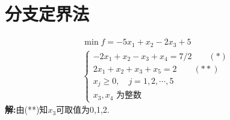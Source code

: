 \documentclass[11pt,AutoFakeBold]{article}
\begin{document}
\section{分支定界法}
        $$\begin{array}{l}
        \min f=-5 x_{1}+x_{2}-2 x_{3}+5 \\
        \left\{\begin{array}{l}
        -2 x_{1}+x_{2}-x_{3}+x_{4}=7/2  \qquad(*)\\
        2 x_{1}+x_{2}+x_{3} +x_{5}=2 \qquad (**)\\
        x_{j} \geqslant 0, \quad j=1,2, \cdots, 5 \\
        x_{3}, x_{4} \text { 为整数 }
        \end{array}\right.\end{array}$$ 
\textbf{解:}由(**)知$x_3$可取值为0,1,2.
\end{document}
